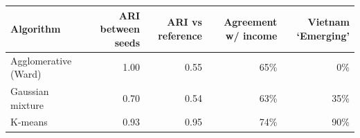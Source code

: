 \small
\begin{tabular}{lrrrr}
\toprule
Algorithm & ARI between seeds & ARI vs reference & Agreement w/ income & Vietnam `Emerging' \\
\midrule
Agglomerative (Ward) & 1.00 & 0.55 & 65\% & 0\% \\
Gaussian mixture & 0.70 & 0.54 & 63\% & 35\% \\
K-means & 0.93 & 0.95 & 74\% & 90\% \\
\bottomrule
\end{tabular}
